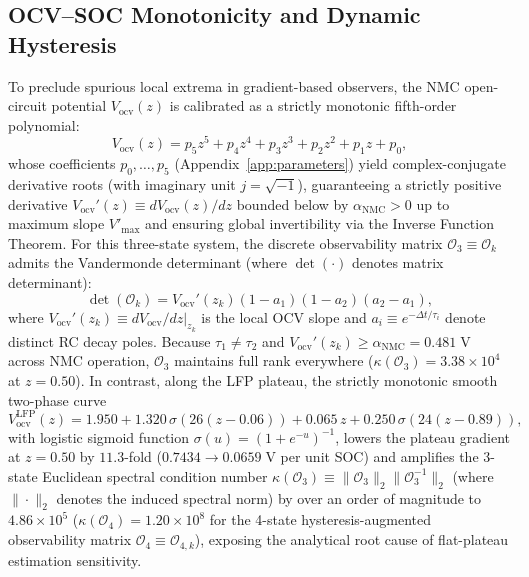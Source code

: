 \documentclass[10pt,a4paper]{article}
\begin{document}
\subsection{OCV--SOC Monotonicity and Dynamic Hysteresis}
To preclude spurious local extrema in gradient-based observers, the NMC open-circuit potential $V_{\text{ocv}}(z)$ is calibrated as a strictly monotonic fifth-order polynomial:
\begin{equation}\label{eqn:ocv_poly}
V_{\text{ocv}}(z) = p_5 z^5 + p_4 z^4 + p_3 z^3 + p_2 z^2 + p_1 z + p_0,
\end{equation}
whose coefficients $p_0,\dots,p_5$ (Appendix~\ref{app:parameters}) yield complex-conjugate derivative roots (with imaginary unit $j = \sqrt{-1}$), guaranteeing a strictly positive derivative $V_{\text{ocv}}'(z) \equiv dV_{\text{ocv}}(z)/dz$ bounded below by $\alpha_{\text{NMC}} > 0$ up to maximum slope $V'_{\max}$ and ensuring global invertibility via the Inverse Function Theorem. For this three-state system, the discrete observability matrix $\mathcal{O}_3 \equiv \mathcal{O}_k$ admits the Vandermonde determinant (where $\det(\cdot)$ denotes matrix determinant):
\begin{equation}\label{eqn:det_obs}
\det(\mathcal{O}_k) = V_{\text{ocv}}'(z_k) (1 - a_1)(1 - a_2)(a_2 - a_1),
\end{equation}
where $V_{\text{ocv}}'(z_k) \equiv dV_{\text{ocv}}/dz|_{z_k}$ is the local OCV slope and $a_i \equiv e^{-\Delta t/\tau_i}$ denote distinct RC decay poles. Because $\tau_1 \ne \tau_2$ and $V_{\text{ocv}}'(z_k) \ge \alpha_{\text{NMC}} = 0.481\;\mathrm{V}$ across NMC operation, $\mathcal{O}_3$ maintains full rank everywhere ($\kappa(\mathcal{O}_3) = 3.38 \times 10^4$ at $z=0.50$). In contrast, along the LFP plateau, the strictly monotonic smooth two-phase curve
\begin{equation}\label{eqn:ocv_lfp}
V_{\text{ocv}}^{\text{LFP}}(z) = 1.950 + 1.320\,\sigma(26(z - 0.06)) + 0.065\,z + 0.250\,\sigma(24(z - 0.89)),
\end{equation}
with logistic sigmoid function $\sigma(u) = (1 + e^{-u})^{-1}$, lowers the plateau gradient at $z=0.50$ by $11.3$-fold ($0.7434 \rightarrow 0.0659\;\mathrm{V}$ per unit SOC) and amplifies the 3-state Euclidean spectral condition number $\kappa(\mathcal{O}_3) \equiv \|\mathcal{O}_3\|_2 \|\mathcal{O}_3^{-1}\|_2$ (where $\|\cdot\|_2$ denotes the induced spectral norm) by over an order of magnitude to $4.86 \times 10^5$ ($\kappa(\mathcal{O}_4) = 1.20 \times 10^8$ for the 4-state hysteresis-augmented observability matrix $\mathcal{O}_4 \equiv \mathcal{O}_{4,k}$), exposing the analytical root cause of flat-plateau estimation sensitivity.
\end{document}
